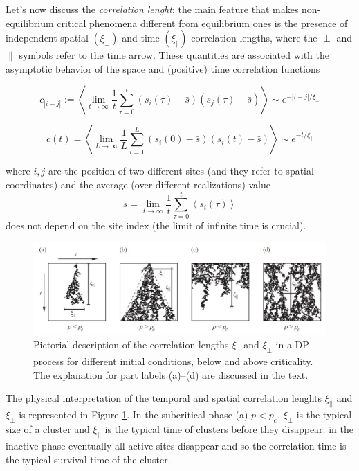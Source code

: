 \documentclass[\main/main.tex]{subfiles}
\begin{document}
Let's now discuss the \textit{correlation lenght}: the main feature that makes non-equilibrium critical phenomena different from equilibrium ones is the presence of independent spatial $\left(\xi_{\perp}\right)$ and time $\left(\xi_{\|}\right)$ correlation lengths, where the $\perp$ and $\|$ symbols refer to the time arrow. These quantities are associated with the asymptotic behavior of the space and (positive) time correlation functions

\begin{equation}
c_{|i-j|}:=\left\langle\lim _{t \rightarrow \infty} \frac{1}{t} \sum_{\tau=0}^{t}\left(s_{i}(\tau)-\bar{s}\right)\left(s_{j}(\tau)-\bar{s}\right)\right\rangle \sim e^{-|i-j| / \xi_{\perp}} 
\label{eq:specialtC}
\end{equation}

\begin{equation}
 c(t)=\left\langle\lim _{L \rightarrow \infty} \frac{1}{L} \sum_{i=1}^{L}\left(s_{i}(0)-\bar{s}\right)\left(s_{i}(t)-\bar{s}\right)\right\rangle \sim e^{-t / \xi_\|} 
 \label{eq:specialxC}
\end{equation}


where $i,j$ are the position of two different sites (and they refer to spatial coordinates) and the average (over different realizations) value
$$
\bar{s}=\lim _{t \rightarrow \infty} \frac{1}{t} \sum_{\tau=0}^{t}\left\langle s_{i}(\tau)\right\rangle
$$
does not depend on the site index (the limit of infinite time is crucial).

\begin{figure}[ht]
    \centering
    \includegraphics[width=\linewidth]{Lectures/dddddd.jpg}
    \caption{Pictorial description of the correlation lengths $\xi_{||}$ and $\xi_{\perp}$ in a DP process for different initial conditions, below and above criticality. The explanation for part labels (a)–(d) are discussed in the text.}
    \label{fig:interepretazione}
\end{figure}

The physical interpretation of the temporal and spatial correlation lenghts $\xi_{||}$ and $\xi_{\perp}$ is represented in Figure \ref{fig:interepretazione}. In the subcritical phase (a) $p<p_c$, $\xi_{\perp}$ is the typical size of a cluster and $\xi_{||}$ is the typical time of clusters before they disappear: in the inactive phase eventually all active sites disappear and so the correlation time is the typical survival time of the cluster.
\end{document}
